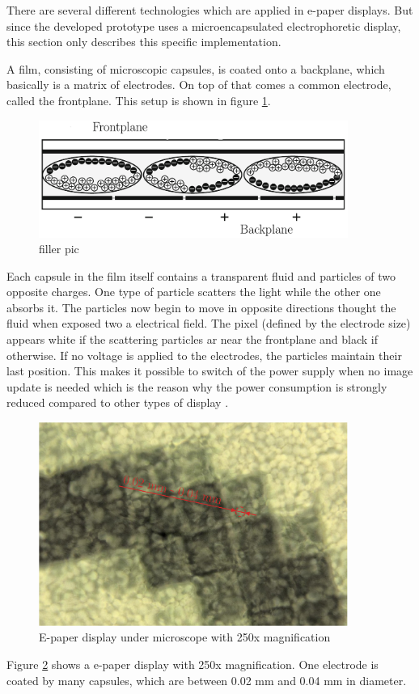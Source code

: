 There are several different technologies which are applied in e-paper displays.
But since the developed prototype uses a microencapsulated electrophoretic display, this section only describes this specific implementation.

A film, consisting of microscopic capsules, is coated onto a backplane, which basically is a matrix of electrodes.
On top of that comes a common electrode, called the frontplane.
This setup is shown in figure \ref{theory:capsules}.

\begin{figure}[H]
	\centering
	\includegraphics[width=0.9\textwidth]{2-theory/e-paper-display/graphics/capsules.pdf}
	\caption{filler pic\label{theory:capsules}}
\end{figure}

Each capsule in the film itself contains a transparent fluid and particles of two opposite charges.
One type of particle scatters the light while the other one absorbs it.
The particles now begin to move in opposite directions thought the fluid when exposed two a electrical field. 
The pixel (defined by the electrode size) appears white if the scattering particles ar near the frontplane and black if otherwise.
If no voltage is applied to the electrodes, the particles maintain their last position.
This makes it possible to switch of the power supply when no image update is needed which is the reason why the power consumption is strongly reduced compared to other types of display \cite{amundson}.

\begin{figure}[H]
	\centering
	\includegraphics[width=0.9\textwidth]{2-theory/e-paper-display/graphics/epaper_mikroskop.pdf}
	\caption{E-paper display under microscope with 250x magnification\label{theory:micro}}
\end{figure}

Figure \ref{theory:micro} shows a e-paper display with 250x magnification.
One electrode is coated by many capsules, which are between 0.02 mm and 0.04 mm in diameter.